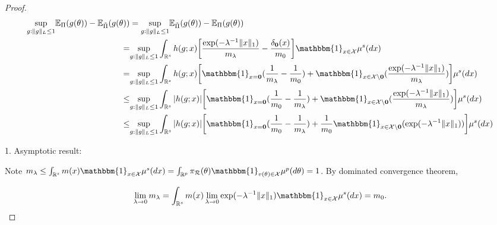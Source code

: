 \documentclass[10pt,fleqn]{article}
\newcommand{\bb}[1]{\mathbb{#1}}
\newcommand{\mc}[1]{\mathcal{#1}}
\DeclareMathOperator{\1}{\mathbbm{1}}
\begin{document}
\begin{proof}[Proof]
\begin{equation}                
\label{wass0}
\begin{aligned}
\underset{g:\|g\|_L\le 1}\sup \bb E_{\Pi}(g(\theta)) -
\bb E_{\tilde \Pi}(g(\theta)) &= \underset{g:\|g\|_L\le 1}\sup \bb E_{\tilde \Pi}(g(\theta)) - \bb E_{\Pi}(g(\theta)) 
\\
=& \underset{g:\|g\|_L\le 1}\sup\int_{\mathbb{R}^{s}}  h(g; x)  \bigg[ \frac{ \exp(- \lambda^{-1} \|x\|_1) } {  m_\lambda}  - 
\frac{ \delta_{\bf 0}(x) } {  m_0} 
\bigg] \mathbbm{1}_{x\in
\mathcal X}\mu^{s}(d x) \\
= &\underset{g:\|g\|_L\le 1}\sup\int_{\mathbb{R}^{s}}  h(g; x) 
 \bigg[ \mathbbm{1}_{x=\bf 0}(\frac{1}{m_\lambda}-\frac{1}{m_0})
 + \mathbbm{1}_{x \in \mc X \setminus\bf 0}(\frac{ \exp(- \lambda^{-1} \|x\|_1) }{m_\lambda})
\bigg]\mu^{s}(d x) \\   
 \le &\underset{g:\|g\|_L\le 1}\sup\int_{\mathbb{R}^{s}}  |h(g; x)| 
 \bigg[ \mathbbm{1}_{x=\bf 0}(\frac{1}{m_0}-\frac{1}{m_\lambda})
 + \mathbbm{1}_{x \in \mc X \setminus\bf 0}(\frac{ \exp(- \lambda^{-1} \|x\|_1) }{m_\lambda})
\bigg]\mu^{s}(d x) \\  
\le &\underset{g:\|g\|_L\le 1}\sup\int_{\mathbb{R}^{s}}  |h(g; x)| 
 \bigg[ \mathbbm{1}_{x=\bf 0}(\frac{1}{m_0}-\frac{1}{m_\lambda})
 + \frac{1}{m_0}\mathbbm{1}_{x \in \mc X \setminus\bf 0}({ \exp(- \lambda^{-1} \|x\|_1) })
\bigg]\mu^{s}(d x)
\end{aligned}
\end{equation}




1. Asymptotic result:






Note $m_\lambda\le  \int_{\mathbb{R}^{s}}  m(x)\mathbbm{1}_{x\in
\mathcal X}\mu^{s}(d x) =\int_{\mathbb{R}^{p}} \pi_{\mc R}(\theta) \mathbbm{1}_{v(\theta)\in
\mathcal X} \mu^p(d \theta) =1$. By dominated convergence theorem, 

\begin{equation}
\lim_{\lambda\to 0}m_\lambda=  \int_{\mathbb{R}^{s}}  m(x)\lim_{\lambda\to 0}\exp(- \lambda^{-1} \| x\|_1 )  \mathbbm{1}_{x\in
\mathcal X}\mu^{s}(d x)   = m_0.
\end{equation}



\end{proof}
\end{document}
